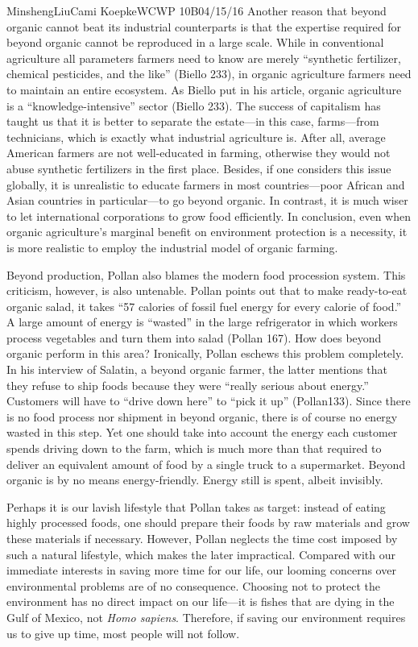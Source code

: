 \documentclass[12pt,letterpaper]{article}
\begin{document}
\begin{mla}{Minsheng}{Liu}{Cami Koepke}{WCWP 10B}{04/15/16}
Another reason that beyond organic cannot beat its industrial
counterparts is that the expertise required for beyond organic cannot be
reproduced in a large scale. While in conventional agriculture all
parameters farmers need to know are merely ``synthetic fertilizer,
chemical pesticides, and the like'' (Biello 233), in organic agriculture
farmers need to maintain an entire ecosystem. As Biello put in his
article, organic agriculture is a ``knowledge-intensive'' sector (Biello
233). The success of capitalism has taught us that it is better to
separate the estate---in this case, farms---from technicians, which is
exactly what industrial agriculture is. After all, average American
farmers are not well-educated in farming, otherwise they would not abuse
synthetic fertilizers in the first place. Besides, if one considers this
issue globally, it is unrealistic to educate farmers in most
countries---poor African and Asian countries in particular---to go
beyond organic. In contrast, it is much wiser to let international
corporations to grow food efficiently. In conclusion, even when organic
agriculture's marginal benefit on environment protection is a necessity,
it is more realistic to employ the industrial model of organic farming.

Beyond production, Pollan also blames the modern food procession system.
This criticism, however, is also untenable. Pollan points out that to
make ready-to-eat organic salad, it takes ``57 calories of fossil fuel
energy for every calorie of food.'' A large amount of energy is
``wasted'' in the large refrigerator in which workers process vegetables
and turn them into salad (Pollan 167). How does beyond organic perform
in this area? Ironically, Pollan eschews this problem completely. In his
interview of Salatin, a beyond organic farmer, the latter mentions that
they refuse to ship foods because they were ``really serious about
energy.'' Customers will have to ``drive down here'' to ``pick it up''
(Pollan133). Since there is no food process nor shipment in beyond
organic, there is of course no energy wasted in this step. Yet one
should take into account the energy each customer spends driving down to
the farm, which is much more than that required to deliver an equivalent
amount of food by a single truck to a supermarket. Beyond organic is by
no means energy-friendly. Energy still is spent, albeit invisibly.

Perhaps it is our lavish lifestyle that Pollan takes as target: instead
of eating highly processed foods, one should prepare their foods by raw
materials and grow these materials if necessary. However, Pollan
neglects the time cost imposed by such a natural lifestyle, which makes
the later impractical. Compared with our immediate interests in saving
more time for our life, our looming concerns over environmental problems
are of no consequence. Choosing not to protect the environment has no
direct impact on our life---it is fishes that are dying in the Gulf of
Mexico, not \emph{Homo sapiens}. Therefore, if saving our environment
requires us to give up time, most people will not follow.


\end{mla}
\end{document}
